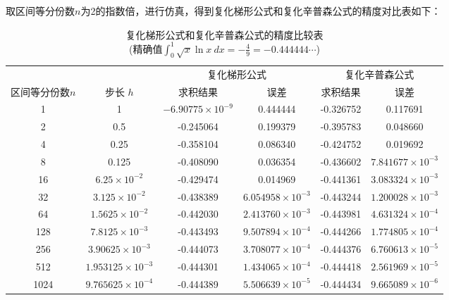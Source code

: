 取区间等分份数$n$为2的指数倍，进行仿真，得到复化梯形公式和复化辛普森公式的精度对比表如下：
\begin{table}[!hpt]
    \caption[梯形和辛普森求积结果对比]{复化梯形公式和复化辛普森公式的精度比较表\\(精确值$\int_{0}^{1} \sqrt{x} \ln x  \ dx = -\frac{4}{9}=-0.444444\cdots$)}
    \label{tab:tb_t_simpson}
    \centering
    \begin{tabular}{@{}cccccc@{}} \toprule
                      &         & \multicolumn{2}{c}{复化梯形公式} & \multicolumn{2}{c}{复化辛普森公式} \\ \cmidrule(r){3-4} \cmidrule(r){5-6}
        区间等分份数$n$ & 步长 $h$                   & 求积结果             & 误差                           & 求积结果 & 误差                    \\ \midrule
        1             & 1                         & $-6.90775\times10^{-9}$ & 0.444444  & -0.326752 & 0.117691 \\
        2             & 0.5                       & -0.245064 & 0.199379                & -0.395783 & 0.048660 \\
        4             & 0.25                      & -0.358104 & 0.086340                & -0.424752 & 0.019692 \\
        8             & 0.125                     & -0.408090 & 0.036354                & -0.436602 & $7.841677\times10^{-3}$\\
        16            & $6.25\times 10^{-2}$      & -0.429474 & 0.014969                & -0.441361 & $3.083324\times10^{-3}$\\
        32            & $3.125\times 10^{-2}$     & -0.438389 & $6.054958\times10^{-3}$ & -0.443244 & $1.200028\times10^{-3}$\\
        64            & $1.5625\times 10^{-2}$    & -0.442030 & $2.413760\times10^{-3}$ & -0.443981 & $4.631324\times10^{-4}$\\
        128           & $7.8125\times 10^{-3}$    & -0.443493 & $9.507894\times10^{-4}$ & -0.444266 & $1.774805\times10^{-4}$\\
        256           & $3.90625\times 10^{-3}$   & -0.444073 & $3.708077\times10^{-4}$ & -0.444376 & $6.760613\times10^{-5}$\\
        512           & $1.953125\times 10^{-3}$  & -0.444301 & $1.434065\times10^{-4}$ & -0.444418 & $2.561969\times10^{-5}$\\
        1024          & $9.765625\times 10^{-4}$  & -0.444389 & $5.506639\times10^{-5}$ & -0.444434 & $9.665089\times10^{-6}$\\
\bottomrule
    \end{tabular}
\end{table}
